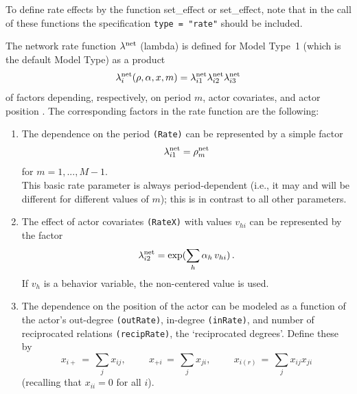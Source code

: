 \documentclass[a4paper,fleqn,11pt]{article}
\newcommand{\+}{\, + \,}
\newcommand{\sfn}[1]{\textsf{#1}}
\begin{document}
To define rate effects by the function \sfn{set\_effect} or \textsf{set\_effect},
note that in the call of these functions the specification
\texttt{type = "rate"} should be included.
\medskip

The network rate function $\lambda^{\rm net}$
(lambda) is defined for Model Type~1 (which is the default Model
Type) as a product \[ \lambda^{\rm net}_i(\rho, \alpha, x, m) =
\lambda^{\rm net}_{i1} \lambda^{\rm net}_{i2} \lambda^{\rm net}_{i3}
\] of factors depending, respectively, on period $m$, actor
covariates, and actor position \citep[see][p.\ 383]{Snijders01}. The
corresponding factors in the rate function are the following:
\begin{enumerate}
 \item The dependence on the period \texttt{(Rate)}
 can be represented by a simple factor
 \[ \lambda^{\rm net}_{i1} = \rho^{\rm net}_m \]
 for $m = 1, ..., M-1$.\\
 This basic rate parameter is always period-dependent (i.e.,
 it may and will be different for
 different values of $m$); this is in contrast to all other parameters.

 \item The effect of actor covariates \texttt{(RateX)} with values
 $v_{hi}$ can be represented by the factor
 \[ \lambda^{\rm net}_{i2} = \exp(\sum_h \alpha_h \, v_{hi})\,. \]
   If $v_{h}$ is a behavior variable, the non-centered value is used.

 \item The dependence on the position of the actor can be modeled
 as a function of the actor's out-degree \texttt{(outRate)},
 in-degree \texttt{(inRate)}, and number
 of reciprocated relations \texttt{(recipRate)}, the `reciprocated degrees'.
 Define these by
 \[ x_{i+} \,=\, \sum_j x_{ij}, \phantom{abcde} x_{+i} \,=\, \sum_j x_{ji},
                \phantom{abcde} x_{i(r)} \,=\, \sum_j x_{ij}x_{ji} \]
 (recalling that $x_{ii} = 0$ for all $i$).\\

\end{enumerate}
\end{document}
